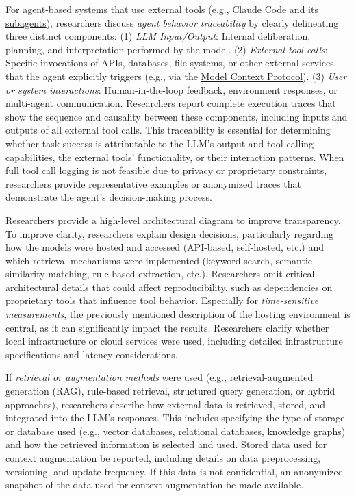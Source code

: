 For agent-based systems that use external tools (e.g., Claude Code and its \href{https://docs.anthropic.com/en/docs/claude-code/sub-agents}{subagents}), researchers \must discuss \emph{agent behavior traceability} by clearly delineating three distinct components: (1) \emph{LLM Input/Output}: Internal deliberation, planning, and interpretation performed by the model. (2) \emph{External tool calls}: Specific invocations of APIs, databases, file systems, or other external services that the agent explicitly triggers (e.g., via the \href{https://modelcontextprotocol.io/}{Model Context Protocol}). (3) \emph{User or system interactions}: Human-in-the-loop feedback, environment responses, or multi-agent communication.
Researchers \should report complete execution traces that show the sequence and causality between these components, including inputs and outputs of all external tool calls.
This traceability is essential for determining whether task success is attributable to the LLM's output and tool-calling capabilities, the external tools' functionality, or their interaction patterns.
When full tool call logging is not feasible due to privacy or proprietary constraints, researchers \should provide representative examples or anonymized traces that demonstrate the agent's decision-making process.

Researchers \should provide a high-level architectural diagram to improve transparency.
To improve clarity, researchers \should explain design decisions, particularly regarding how the models were hosted and accessed (API-based, self-hosted, etc.) and which retrieval mechanisms were implemented (keyword search, semantic similarity matching, rule-based extraction, etc.).
Researchers \mustnot omit critical architectural details that could affect reproducibility, such as dependencies on proprietary tools that influence tool behavior. 
Especially for \emph{time-sensitive measurements}, the previously mentioned description of the hosting environment is central, as it can significantly impact the results.
Researchers \must clarify whether local infrastructure or cloud services were used, including detailed infrastructure specifications and latency considerations.

If \emph{retrieval or augmentation methods} were used (e.g., retrieval-augmented generation (RAG), rule-based retrieval, structured query generation, or hybrid approaches), researchers \must describe how external data is retrieved, stored, and integrated into the LLM's responses.
This includes specifying the type of storage or database used (e.g., vector databases, relational databases, knowledge graphs) and how the retrieved information is selected and used.
Stored data used for context augmentation \must be reported, including details on data preprocessing, versioning, and update frequency.
If this data is not confidential, an anonymized snapshot of the data used for context augmentation \should be made available.

